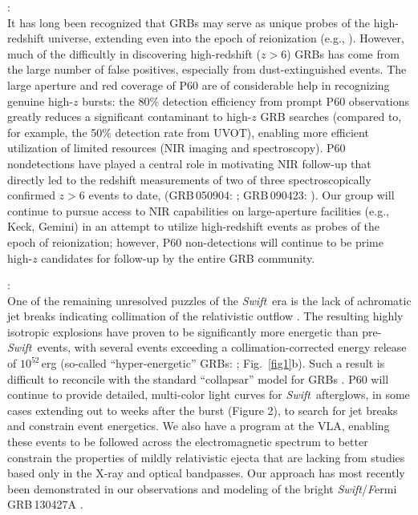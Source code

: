 \documentclass[letterpaper,11pt]{article}
\newcommand{\swift}{\textit{Swift}}
\begin{document}
:
\smallskip\\
It has long been recognized that GRBs may serve as unique probes of
the high-redshift universe, extending even into the epoch
of reionization (e.g., \citealt{lr00}).  However, much of the 
difficultly in discovering high-redshift ($z > 6$) GRBs  
has come from the large number of false positives, especially from 
dust-extinguished events.  The large aperture and red coverage 
of P60 are of considerable help in recognizing genuine high-$z$ bursts:  
the 80\% detection efficiency from prompt P60 observations 
greatly reduces a significant contaminant to high-$z$ GRB searches 
(compared to, for example, the 50\% detection rate from UVOT), enabling 
more efficient utilization of limited resources (NIR imaging and spectroscopy).  
P60 nondetections have played a central role in motivating NIR follow-up that 
directly led to the redshift measurements of two of three spectroscopically 
confirmed $z>6$ events to date, (GRB\,050904: \citealt{hnr+06}; GRB\,090423: 
\citealt{trl+09}).  Our group will continue to pursue access to NIR capabilities
on large-aperture facilities (e.g., Keck, Gemini) in an attempt to utilize 
high-redshift events as probes of the epoch of reionization; however, 
P60 non-detections will continue to be prime high-$z$ candidates for 
follow-up by the entire GRB community.

:
\smallskip\\
One of the remaining unresolved puzzles of the \swift\ era is the lack
of achromatic jet breaks indicating collimation of the relativistic outflow
\citep{kb08,rlb+09,p07}.  The resulting highly isotropic explosions have
proven to be significantly more energetic than pre-\swift\ events, with
several events exceeding a collimation-corrected energy release of
$10^{52}$\,erg (so-called ``hyper-energetic'' GRBs: \citealt{ccf+08,ckh+06};
Fig.~\ref{fig1}b).  Such a result is difficult to reconcile with the
standard ``collapsar'' model for GRBs \citep{woo93}.  
P60  will continue to provide 
detailed, multi-color light curves for \swift\ afterglows, in some cases extending 
out to weeks after the burst (Figure 2), to search for jet breaks and constrain event energetics.  
We also have a program at the VLA, enabling these events to be followed
across the electromagnetic spectrum to better constrain the properties of mildly 
relativistic ejecta that are lacking from studies based only in the X-ray and 
optical bandpasses.  Our approach has most recently been demonstrated in our
observations and modeling of the bright \swift/{\emph Fermi} GRB\,130427A \citep{pcc+2013}.
\end{document}
